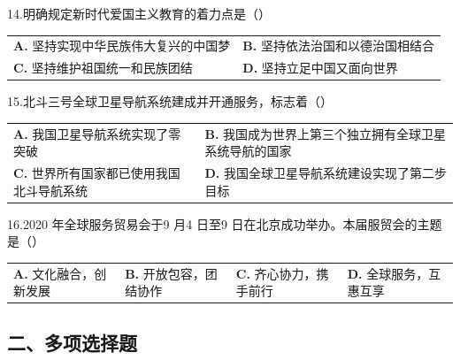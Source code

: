 \documentclass[UTF8,11pt]{ctexart}
\begin{document}
14.明确规定新时代爱国主义教育的着力点是（）


\begin{center}\begin{tabular}{>{\raggedright\arraybackslash}p{\dimexpr(\linewidth-4\tabcolsep)/2\relax}>{\raggedright\arraybackslash}p{\dimexpr(\linewidth-4\tabcolsep)/2\relax}}
\textbf{A.} 坚持实现中华民族伟大复兴的中国梦 & \textbf{B.} 坚持依法治国和以德治国相结合\\[.35em]
\textbf{C.} 坚持维护祖国统一和民族团结 & \textbf{D.} 坚持立足中国又面向世界\\[.35em]\end{tabular}\end{center}

15.北斗三号全球卫星导航系统建成并开通服务，标志着（）


\begin{center}\begin{tabular}{>{\raggedright\arraybackslash}p{\dimexpr(\linewidth-4\tabcolsep)/2\relax}>{\raggedright\arraybackslash}p{\dimexpr(\linewidth-4\tabcolsep)/2\relax}}
\textbf{A.} 我国卫星导航系统实现了零突破 & \textbf{B.} 我国成为世界上第三个独立拥有全球卫星系统导航的国家\\[.35em]
\textbf{C.} 世界所有国家都已使用我国北斗导航系统 & \textbf{D.} 我国全球卫星导航系统建设实现了第二步目标\\[.35em]\end{tabular}\end{center}

16.2020 年全球服务贸易会于9 月4 日至9 日在北京成功举办。本届服贸会的主题是（）


\begin{center}\begin{tabular}{>{\raggedright\arraybackslash}p{\dimexpr(\linewidth-8\tabcolsep)/4\relax}>{\raggedright\arraybackslash}p{\dimexpr(\linewidth-8\tabcolsep)/4\relax}>{\raggedright\arraybackslash}p{\dimexpr(\linewidth-8\tabcolsep)/4\relax}>{\raggedright\arraybackslash}p{\dimexpr(\linewidth-8\tabcolsep)/4\relax}}
\textbf{A.} 文化融合，创新发展 & \textbf{B.} 开放包容，团结协作 & \textbf{C.} 齐心协力，携手前行 & \textbf{D.} 全球服务，互惠互享\\[.35em]\end{tabular}\end{center}

\subsection*{二、多项选择题}
\end{document}
